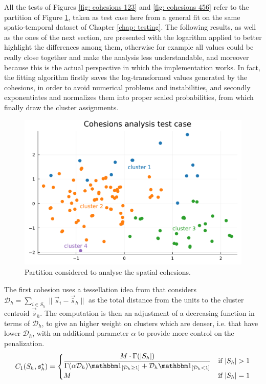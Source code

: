 \documentclass[12pt,	%
	a4paper,		%
	twoside,		%
	openright,		%
	titlepage,%
	]{book}
\theoremstyle{definition}
\begin{document}
All the tests of Figures \ref{fig: cohesions 123} and \ref{fig: cohesions 456} refer to the partition of Figure \ref{fig: cohesions_test}, taken as test case here from a general fit on the same spatio-temporal dataset of Chapter \ref{chap: testing}. The following results, as well as the ones of the next section, are presented with the logarithm applied to better highlight the differences among them, otherwise for example all values could be really close together and make the analysis less understandable, and moreover because this is the actual perspective in which the implementation works. In fact, the fitting algorithm firstly saves the log-transformed values generated by the cohesions, in order to avoid numerical problems and instabilities, and secondly exponentiates and normalizes them into proper scaled probabilities, from which finally draw the cluster assignments.  

\begin{figure}[h]
    \centering
    \includegraphics[width=1\linewidth]{model description/spatial cohesion analysis/cohesions_test.pdf}
    \caption[Partition considered for the cohesion analysis]{Partition considered to analyse the spatial cohesions.}
    \label{fig: cohesions_test}
\end{figure}

The first cohesion uses a tessellation idea from \cite{cohesion1-denison} that considers $\mathcal{D}_h = \sum_{i \in S_h} \| \vec{s}_i - \vec{\bar s}_h\|$ as the total distance from the units to the cluster centroid $\vec{\bar s}_h$. The computation is then an adjustment of a decreasing function in terms of $\mathcal{D}_h$, to give an higher weight on clusters which are denser, i.e. that have lower $\mathcal{D}_h$, with an additional parameter $\alpha$ to provide more control on the penalization.
\begin{equation}    
C_1(S_{h},\vec{s}_{h}^\star) = \begin{cases}
    \dfrac{M \cdot \Gamma(|S_h|)}{\Gamma(\alpha \mathcal{D}_h) \indicator{[\mathcal{D}_h\geq 1]} + \mathcal{D}_h \indicator{[\mathcal{D}_h<1]}} & \text{if } |S_h| > 1\\ 
   \hfil M & \text{if } |S_h| = 1
\end{cases}
\end{equation}
\end{document}

